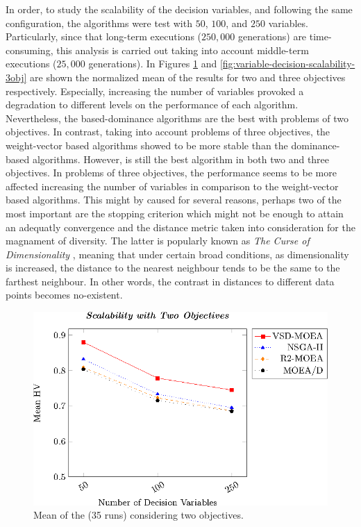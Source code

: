 In order, to study the scalability of the decision variables, and following the same configuration, the algorithms were test with $50$, $100$, and $250$ variables.
%
Particularly, since that long-term executions ($250,000$ generations) are time-consuming, this analysis is carried out taking into account middle-term executions ($25,000$ generations).
%
In Figures \ref{fig:variable-decision-scalability-2obj} and \ref{fig:variable-decision-scalability-3obj} are shown the normalized mean of the \HV{} results for two and three objectives respectively.
%
Especially, increasing the number of variables provoked a degradation to different levels on the performance of each algorithm.
%
Nevertheless, the based-dominance algorithms are the best with problems of two objectives.
%
In contrast, taking into account problems of three objectives, the weight-vector based algorithms showed to be more stable than the dominance-based algorithms.
%
%
However, \VSDMOEA{} is still the best algorithm in both two and three objectives.
% 
In problems of three objectives, the \VSDMOEA{} performance seems to be more affected increasing the number of variables in comparison to the weight-vector based algorithms.
%
This might by caused for several reasons, perhaps two of the most important are the stopping criterion which might not be enough to attain an adequatly convergence and the distance metric taken into consideration for the magnament of diversity.
%
The latter is popularly known as \textit{The Curse of Dimensionality} \cite{trunk1979problem, beyer1999nearest}, meaning that under certain broad conditions, as dimensionality is increased, the distance to the nearest neighbour tends to be the same to the farthest neighbour.
%
In other words, the contrast in distances to different data points becomes no-existent.


\begin{figure}[t]
\centering
\includegraphics[]{Images/Graphic-Scalability-2obj_tikz-figure0.eps}
%
\caption{Mean of the \HV{} (35 runs) considering two objectives.}\label{fig:variable-decision-scalability-2obj}
\end{figure}

